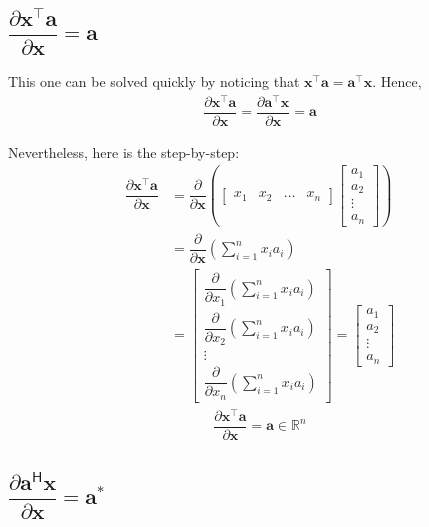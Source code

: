 \documentclass{article}
\newcommand{\trans}{\top}
\newcommand{\hermit}{\mathsf{H}}
\begin{document}
\subsection{\(\dfrac{\partial \mathbf{x}^\trans  \mathbf{a}}{\partial \mathbf{x}} = \mathbf{a}\)}

This one can be solved quickly by noticing that \(\mathbf{x}^\trans  \mathbf{a} = \mathbf{a}^\trans  \mathbf{x}\). Hence,
\begin{align}
    \dfrac{\partial \mathbf{x}^\trans  \mathbf{a}}{\partial \mathbf{x}} = \dfrac{\partial \mathbf{a}^\trans  \mathbf{x}}{\partial \mathbf{x}} = \mathbf{a}
\end{align}

Nevertheless, here is the step-by-step:
\begin{align}
    \dfrac{\partial \mathbf{x}^\trans \mathbf{a}}{\partial \mathbf{x}} &= \dfrac{\partial}{\partial \mathbf{x}} \left(
    \begin{bmatrix}
        x_1 & x_2 & \dots & x_n
    \end{bmatrix} \begin{bmatrix}
        a_{1} \\ a_{2} \\ \vdots \\ a_{n}
    \end{bmatrix} \right) \\
    & = \dfrac{\partial}{\partial \mathbf{x}} \left( \sum_{i = 1}^n x_ia_i \right) \\
    & = \begin{bmatrix}
        \dfrac{\partial}{\partial x_1} \left( \sum_{i = 1}^n x_ia_i \right) \\ \dfrac{\partial}{\partial x_2} \left( \sum_{i = 1}^n x_ia_i \right) \\ \vdots \\ \dfrac{\partial}{\partial x_n} \left( \sum_{i = 1}^n x_ia_i \right) 
    \end{bmatrix} 
    = \begin{bmatrix}
        a_1 \\ a_2 \\ \vdots \\ a_n
    \end{bmatrix}
\end{align}
\begin{align}
    \boxed{\dfrac{\partial \mathbf{x}^\trans \mathbf{a}}{\partial \mathbf{x}} = \mathbf{a} \in \mathbb{R}^{n}}
\end{align}

\subsection{\(\dfrac{\partial \mathbf{a}^\hermit  \mathbf{x}}{\partial \mathbf{x}} = \mathbf{a}^*\)}
\end{document}
